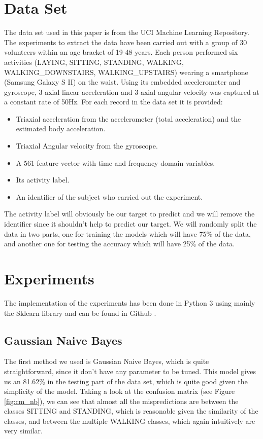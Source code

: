 \documentclass[conference,a4paper]{IEEEtran}
\begin{document}
\section{Data Set}
The data set\cite{dataset} used in this paper is from the UCI Machine Learning Repository\cite{uci}. The experiments to extract the data have been carried out with a group of 30 volunteers within an age bracket of 19-48 years. Each person performed six activities (LAYING, SITTING, STANDING, WALKING, WALKING\_DOWNSTAIRS, WALKING\_UPSTAIRS) wearing a smartphone (Samsung Galaxy S II) on the waist. Using its embedded accelerometer and gyroscope, 3-axial linear acceleration and 3-axial angular velocity was captured at a constant rate of 50Hz. For each record in the data set it is provided:
\begin{itemize}
\item Triaxial acceleration from the accelerometer (total acceleration) and the estimated body acceleration.
\item Triaxial Angular velocity from the gyroscope.
\item A 561-feature vector with time and frequency domain variables.
\item Its activity label.
\item An identifier of the subject who carried out the experiment.
\end{itemize}
The activity label will obviously be our target to predict and we will remove the identifier since it shouldn't help to predict our target. We will randomly split the data in two parts, one for training the models which will have 75\% of the data, and another one for testing the accuracy which will have 25\% of the data.

\section{Experiments}
The implementation of the experiments has been done in Python 3 using mainly the Sklearn library and can be found in Github \cite{code}. 
\subsection{Gaussian Naive Bayes}
The first method we used is Gaussian Naive Bayes, which is quite straightforward, since it don't have any parameter to be tuned. This model gives us an 81.62\% in the testing part of the data set, which is quite good given the simplicity of the model. Taking a look at the confusion matrix (see Figure \ref{fig:cm_nb}), we can see that almost all the mispredictions are between the classes SITTING and STANDING, which is reasonable given the similarity of the classes, and between the multiple WALKING classes, which again intuitively are very similar.
\end{document}
